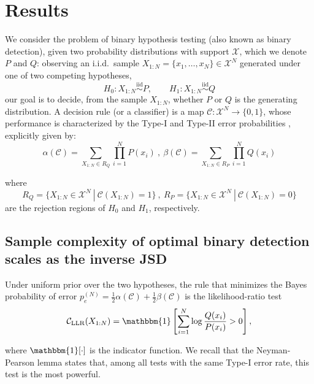 \documentclass{article}
\begin{document}
\section*{Results }

We consider the problem of binary hypothesis testing (also known as binary detection), given two probability distributions with support $\mathcal{X}$, which we denote $P$ and $Q$: observing an i.i.d.\ sample $X_{1:N}=\{x_1,\dots,x_N\} \in \mathcal{X}^N$ generated under one of two competing hypotheses,
\begin{equation}
H_0: X_{1:N} \overset{\text{iid}}{\sim} P, \qquad H_1: X_{1:N} \overset{\text{iid}}{\sim} Q
\end{equation}
our goal is to decide, from the sample $X_{1:N}$, whether $P$ or $Q$ is the generating distribution. A decision rule (or a classifier) is a map $\mathcal{C}: \mathcal{X}^N \to \{0,1\}$, whose performance is characterized by the Type-I and Type-II error probabilities \cite{neyman_ix_1933,cover_elements_2005}, explicitly given by:
\begin{equation}
    \alpha(\mathcal{C}) = \sum_{ X_{1:N} \in R_Q} \prod_{i=1}^N P(x_i) \ , \ 
    \beta(\mathcal{C}) = \sum_{ X_{1:N} \in R_P} \prod_{i=1}^N Q(x_i)
\end{equation}

\noindent where 
\begin{equation}
    R_Q = \{ X_{1:N} \in \mathcal{X}^N \ |  \ \mathcal{C}(X_{1:N}) = 1 \} \ , \   R_P = \{ X_{1:N} \in \mathcal{X}^N \ |  \ \mathcal{C}(X_{1:N}) = 0 \}
\end{equation}
\noindent are the rejection regions of $H_0$ and $H_1$, respectively.

\subsection*{Sample complexity of optimal binary detection scales as the inverse JSD}

Under uniform prior over the two hypotheses, the rule that minimizes the Bayes probability of error $p_e^{(N)}=\tfrac{1}{2} \alpha(\mathcal{C}) + \tfrac{1}{2} \beta(\mathcal{C})$ is the likelihood-ratio test
\begin{equation}\label{LLR_classifier}
\mathcal{C}_{\text{LLR}}(X_{1:N}) = \mathbbm{1} \left[ \sum_{i=1}^N \log \frac{Q(x_i)}{P(x_i)} > 0 \right],
\end{equation}

\noindent where $\mathbbm{1}[\cdot]$ is the indicator function.
We recall that the Neyman-Pearson lemma \cite{neyman_ix_1933} states that, among all tests with the same Type-I error rate, this test is the most powerful.
\end{document}
